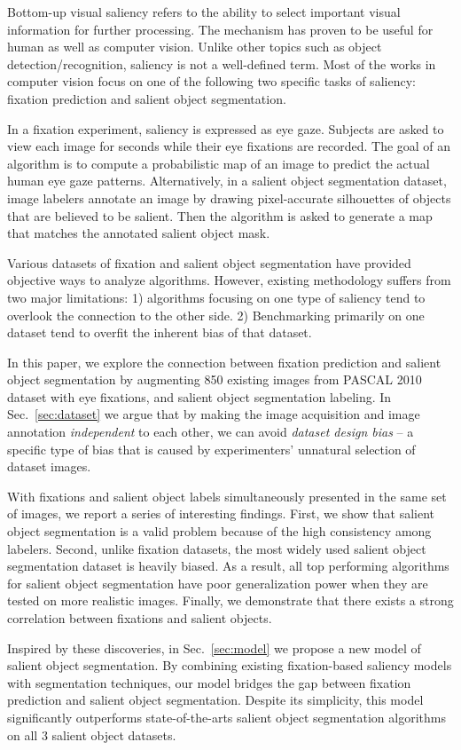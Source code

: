 Bottom-up visual saliency refers to the ability to select important visual information for further processing.  The mechanism has proven to be useful for human as well as computer vision.  Unlike other topics such as object detection/recognition, saliency is not a well-defined term.  Most of the works in computer vision focus on one of the following two specific tasks of saliency: fixation prediction and salient object segmentation.

In a fixation experiment, saliency is expressed as eye gaze.  Subjects are asked to view each image for seconds while their eye fixations are recorded.  The goal of an algorithm is to compute a probabilistic map of an image to predict the actual human eye gaze patterns.  Alternatively, in a salient object segmentation dataset, image labelers annotate an image by drawing pixel-accurate silhouettes of objects that are believed to be salient.  Then the algorithm is asked to generate a map that matches the annotated salient object mask.

Various datasets of fixation and salient object segmentation have provided objective ways to analyze algorithms.  However, existing methodology suffers from two major limitations:  1) algorithms focusing on one type of saliency tend to overlook the connection to the other side.  2) Benchmarking primarily on one dataset tend to overfit the inherent bias of that dataset.


In this paper, we explore the connection between fixation prediction and salient object segmentation by augmenting 850 existing images from PASCAL 2010 \cite{pascal-voc-2010} dataset with eye fixations, and salient object segmentation labeling.  In Sec.~\ref{sec:dataset} we argue that by making the image acquisition and image annotation \emph{independent} to each other, we can avoid \emph{dataset design bias} -- a specific type of bias that is caused by experimenters' unnatural selection of dataset images.



With fixations and salient object labels simultaneously presented in the same set of images, we report a series of interesting findings.  First, we show that salient object segmentation is a valid problem because of the high consistency among labelers.  Second, unlike fixation datasets, the most widely used salient object segmentation dataset is heavily biased.  As a result, all top performing algorithms for salient object segmentation have poor generalization power when they are tested on more realistic images. Finally, we demonstrate that there exists a strong correlation between fixations and salient objects.



Inspired by these discoveries, in Sec.~\ref{sec:model} we propose a new model of salient object segmentation. By combining existing fixation-based saliency models with segmentation techniques, our model bridges the gap between fixation prediction and salient object segmentation.  Despite its simplicity, this model significantly outperforms state-of-the-arts salient object segmentation algorithms on all 3 salient object datasets.
